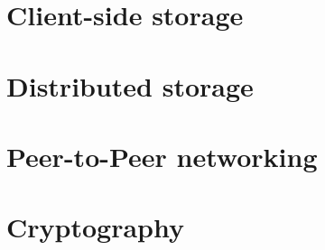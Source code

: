 \section{Client-side storage}


\section{Distributed storage}


\section{Peer-to-Peer networking}


\section{Cryptography}

